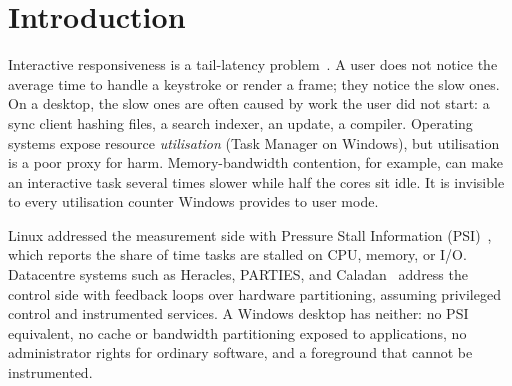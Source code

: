\section{Introduction}

Interactive responsiveness is a tail-latency problem~\cite{dean2013tail}. A user does not notice the average time to handle a keystroke or render a frame; they notice the slow ones. On a desktop, the slow ones are often caused by work the user did not start: a sync client hashing files, a search indexer, an update, a compiler. Operating systems expose resource \emph{utilisation} (Task Manager on Windows), but utilisation is a poor proxy for harm. Memory-bandwidth contention, for example, can make an interactive task several times slower while half the cores sit idle. It is invisible to every utilisation counter Windows provides to user mode.

Linux addressed the measurement side with Pressure Stall Information (PSI)~\cite{weiner2018psi}, which reports the share of time tasks are stalled on CPU, memory, or I/O. Datacentre systems such as Heracles, PARTIES, and Caladan~\cite{lo2015heracles,chen2019parties,fried2020caladan} address the control side with feedback loops over hardware partitioning, assuming privileged control and instrumented services. A Windows desktop has neither: no PSI equivalent, no cache or bandwidth partitioning exposed to applications, no administrator rights for ordinary software, and a foreground that cannot be instrumented.


